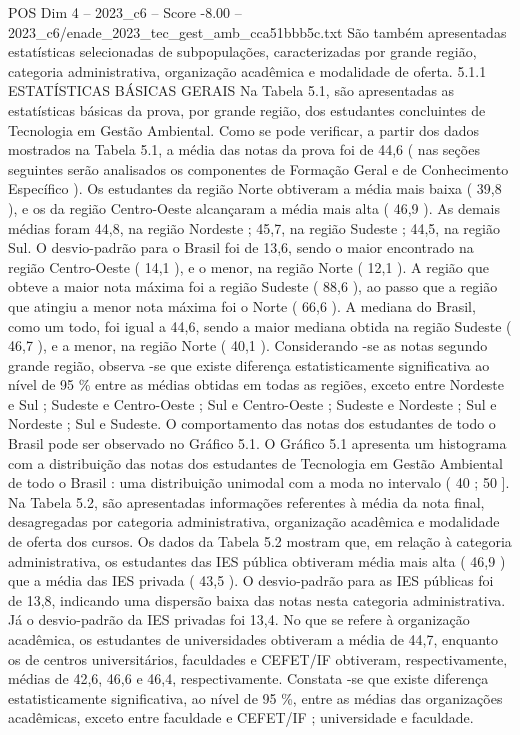 \begin{textsample}{POS Dim 4 – 2023\_c6 – Score -8.00 – 2023\_c6/enade\_2023\_tec\_gest\_amb\_cca51bbb5c.txt}
São também apresentadas estatísticas selecionadas de subpopulações, caracterizadas por grande região, categoria administrativa, organização acadêmica e modalidade de oferta. 5.1.1 ESTATÍSTICAS BÁSICAS GERAIS Na Tabela 5.1, são apresentadas as estatísticas básicas da prova, por grande região, dos estudantes concluintes de Tecnologia em Gestão Ambiental.
Como se pode verificar, a partir dos dados mostrados na Tabela 5.1, a média das notas da prova foi de 44,6 ( nas seções seguintes serão analisados os componentes de Formação Geral e de Conhecimento Específico ).
Os estudantes da região Norte obtiveram a média mais baixa ( 39,8 ), e os da região Centro-Oeste alcançaram a média mais alta ( 46,9 ).
As demais médias foram 44,8, na região Nordeste ; 45,7, na região Sudeste ; 44,5, na região Sul.
O desvio-padrão para o Brasil foi de 13,6, sendo o maior encontrado na região Centro-Oeste ( 14,1 ), e o menor, na região Norte ( 12,1 ).
A região que obteve a maior nota máxima foi a região Sudeste ( 88,6 ), ao passo que a região que atingiu a menor nota máxima foi o Norte ( 66,6 ).
A mediana do Brasil, como um todo, foi igual a 44,6, sendo a maior mediana obtida na região Sudeste ( 46,7 ), e a menor, na região Norte ( 40,1 ).
Considerando -se as notas segundo grande região, observa -se que existe diferença estatisticamente significativa ao nível de 95 \% entre as médias obtidas em todas as regiões, exceto entre Nordeste e Sul ; Sudeste e Centro-Oeste ; Sul e Centro-Oeste ; Sudeste e Nordeste ; Sul e Nordeste ; Sul e Sudeste.
O comportamento das notas dos estudantes de todo o Brasil pode ser observado no Gráfico 5.1.
O Gráfico 5.1 apresenta um histograma com a distribuição das notas dos estudantes de Tecnologia em Gestão Ambiental de todo o Brasil : uma distribuição unimodal com a moda no intervalo ( 40 ; 50 ].
Na Tabela 5.2, são apresentadas informações referentes à média da nota final, desagregadas por categoria administrativa, organização acadêmica e modalidade de oferta dos cursos.
Os dados da Tabela 5.2 mostram que, em relação à categoria administrativa, os estudantes das IES pública obtiveram média mais alta ( 46,9 ) que a média das IES privada ( 43,5 ).
O desvio-padrão para as IES públicas foi de 13,8, indicando uma dispersão baixa das notas nesta categoria administrativa.
Já o desvio-padrão da IES privadas foi 13,4.
No que se refere à organização acadêmica, os estudantes de universidades obtiveram a média de 44,7, enquanto os de centros universitários, faculdades e CEFET/IF obtiveram, respectivamente, médias de 42,6, 46,6 e 46,4, respectivamente.
Constata -se que existe diferença estatisticamente significativa, ao nível de 95 \%, entre as médias das organizações acadêmicas, exceto entre faculdade e CEFET/IF ; universidade e faculdade.

\end{textsample}
